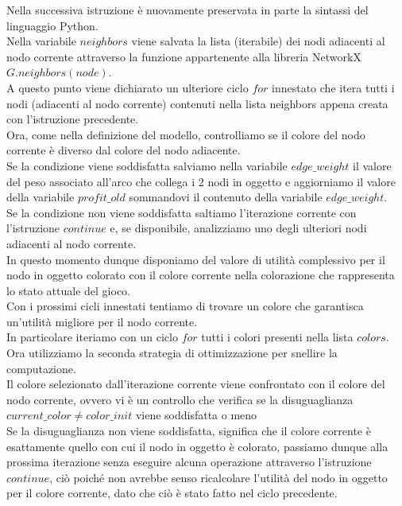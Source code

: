 Nella successiva istruzione è nuovamente preservata in parte la sintassi del linguaggio Python.\\
Nella variabile $neighbors$ viene salvata la lista (iterabile) dei nodi adiacenti al nodo corrente attraverso la funzione appartenente alla libreria NetworkX $G.neighbors(node)$.\\

A questo punto viene dichiarato un ulteriore ciclo $for$ innestato che itera tutti i nodi (adiacenti al nodo corrente) contenuti nella lista neighbors appena creata con l'istruzione precedente.\\

Ora, come nella definizione del modello, controlliamo se il colore del nodo corrente è diverso dal colore del nodo adiacente.\\
Se la condizione viene soddisfatta salviamo nella variabile $edge\_weight$ il valore del peso associato all'arco che collega i 2 nodi in oggetto e aggiorniamo il valore della variabile $profit\_old$ sommandovi il contenuto della variabile $edge\_weight$.\\

Se la condizione non viene soddisfatta saltiamo l'iterazione corrente con l'istruzione $continue$ e, se disponibile, analizziamo uno degli ulteriori nodi adiacenti al nodo corrente.\\

In questo momento dunque disponiamo del valore di utilità complessivo per il nodo in oggetto colorato con il colore corrente nella colorazione che rappresenta lo stato attuale del gioco.\\
Con i prossimi cicli innestati tentiamo di trovare un colore che garantisca un'utilità migliore per il nodo corrente.\\

In particolare iteriamo con un ciclo $for$ tutti i colori presenti nella lista $colors$.\\
Ora utilizziamo la seconda strategia di ottimizzazione per snellire la computazione.\\
Il colore selezionato dall'iterazione corrente viene confrontato con il colore del nodo corrente, ovvero vi è un controllo che verifica se la disuguaglianza $current\_color \neq color\_init$ viene soddisfatta o meno\\

Se la disuguaglianza non viene soddisfatta, significa che il colore corrente è esattamente quello con cui il nodo in oggetto è colorato, passiamo dunque alla prossima iterazione senza eseguire alcuna operazione attraverso l'istruzione $continue$, ciò poiché non avrebbe senso ricalcolare l'utilità del nodo in oggetto per il colore corrente, dato che ciò è stato fatto nel ciclo precedente.\\

